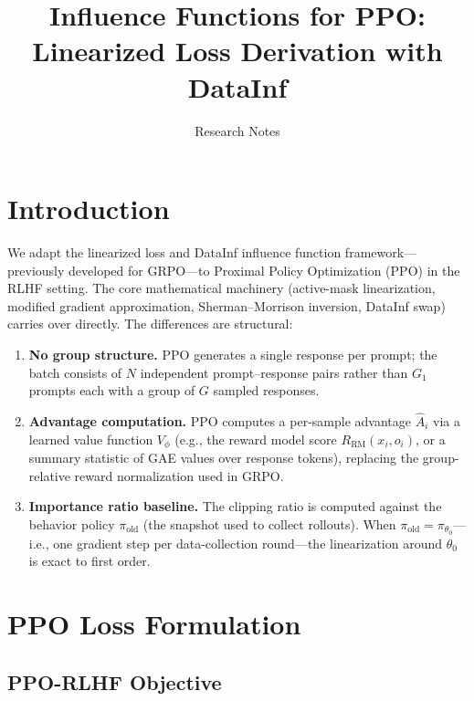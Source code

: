\documentclass{article}
\title{Influence Functions for PPO: Linearized Loss Derivation with DataInf}
\author{Research Notes}
\date{}
\begin{document}
\maketitle

\section{Introduction}

We adapt the linearized loss and DataInf influence function framework---previously developed for GRPO---to Proximal Policy Optimization (PPO) in the RLHF setting.
The core mathematical machinery (active-mask linearization, modified gradient approximation, Sherman--Morrison inversion, DataInf swap) carries over directly.
The differences are structural:

\begin{enumerate}
    \item \textbf{No group structure.} PPO generates a single response per prompt; the batch consists of $N$ independent prompt--response pairs rather than $G_1$ prompts each with a group of $G$ sampled responses.
    \item \textbf{Advantage computation.} PPO computes a per-sample advantage $\hat{A}_i$ via a learned value function $V_\phi$ (e.g., the reward model score $R_{\mathrm{RM}}(x_i,o_i)$, or a summary statistic of GAE values over response tokens), replacing the group-relative reward normalization used in GRPO.
    \item \textbf{Importance ratio baseline.} The clipping ratio is computed against the behavior policy $\pi_{\mathrm{old}}$ (the snapshot used to collect rollouts). When $\pi_{\mathrm{old}} = \pi_{\theta_0}$---i.e., one gradient step per data-collection round---the linearization around $\theta_0$ is exact to first order.
\end{enumerate}

\section{PPO Loss Formulation}

\subsection{PPO-RLHF Objective}
\end{document}
